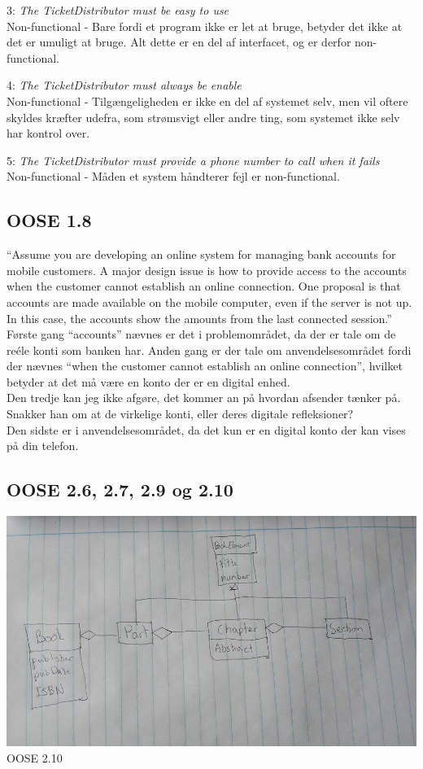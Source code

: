 \documentclass{article}
\begin{document}
3: \textit{The TicketDistributor must be easy to use} \\
Non-functional - Bare fordi et program ikke er let at bruge, betyder det ikke at det er umuligt at bruge. Alt dette er en del af interfacet, og er derfor non-functional.

4: \textit{The TicketDistributor must always be enable} \\
Non-functional - Tilgængeligheden er ikke en del af systemet selv, men vil oftere skyldes kræfter udefra, som strømsvigt eller andre ting, som systemet ikke selv har kontrol over.

5: \textit{The TicketDistributor must provide a phone number to call when it fails} \\
Non-functional - Måden et system håndterer fejl er non-functional.

\subsection{OOSE 1.8}
“Assume you are developing an online system for managing bank accounts for
mobile customers. A major design issue is how to provide access to the accounts
when the customer cannot establish an online connection. One proposal is that
accounts are made available on the mobile computer, even if the server is not up. In
this case, the accounts show the amounts from the last connected session.”
\\
Første gang “accounts” nævnes er det i problemområdet, da der er tale om de reéle konti som banken har.
Anden gang er der tale om anvendelsesområdet fordi der nævnes “when the customer cannot establish an online connection”, hvilket betyder at det må være en konto der er en digital enhed.
\\
Den tredje kan jeg ikke afgøre, det kommer an på hvordan afsender tænker på. Snakker han om at de virkelige konti, eller deres digitale refleksioner? \\
Den sidste er i anvendelsesområdet, da det kun er en digital konto der kan vises på din telefon.

\subsection{OOSE 2.6, 2.7, 2.9 og 2.10}
\includegraphics[scale=.5]{OOSE210.jpg} {\footnotesize OOSE 2.10}
\end{document}

